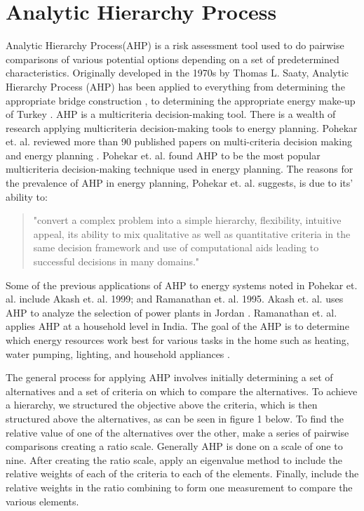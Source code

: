 \documentclass[12pt]{UIdahoMastersThesis}
\begin{document}
\section{Analytic Hierarchy Process}
Analytic Hierarchy Process(AHP) is a risk assessment tool used to do pairwise comparisons of various potential options depending on a set of predetermined characteristics. Originally developed in the 1970s by Thomas L. Saaty, Analytic Hierarchy Process (AHP) has been applied to everything from determining the appropriate bridge construction \cite{Pan2008}, to determining the appropriate energy make-up of Turkey\cite{Kahraman2010} \cite{Saaty1987}. AHP is a multicriteria decision-making tool. There is a wealth of research applying multicriteria decision-making tools to energy planning. Pohekar et. al. reviewed more than 90 published papers on multi-criteria decision making and energy planning \cite{Pohekar2004}. Pohekar et. al. found AHP to be the most popular multicriteria decision-making technique used in energy planning. The reasons for the prevalence of AHP in energy planning, Pohekar et. al. suggests, is due to its' ability to:
\begin{quote}
	"convert a complex problem into a simple hierarchy, flexibility, intuitive appeal, its ability to mix qualitative as well as quantitative criteria in the same decision framework and use of computational aids leading to successful decisions in many domains."
 \end{quote}
Some of the previous applications of AHP to energy systems noted in Pohekar et. al. include Akash et. al.  1999; and Ramanathan et. al. 1995. Akash et. al. uses AHP to analyze the selection of power plants in Jordan \cite{Akash1999}.  Ramanathan et. al. applies AHP at a household level in India.  The goal of the AHP is to determine which energy resources work best for various tasks in the home such as heating, water pumping, lighting, and household appliances \cite{Ramanathan1995}.

The general process for applying AHP involves initially determining a set of alternatives and a set of criteria on which to compare the alternatives. To achieve a hierarchy, we structured the objective above the criteria, which is then structured above the alternatives, as can be seen in figure 1 below. To find the relative value of one of the alternatives over the other, make a series of pairwise comparisons creating a ratio scale.  Generally AHP is done on a scale of one to nine. After creating the ratio scale, apply an eigenvalue method to include the relative weights of each of the criteria to each of  the elements. Finally, include the relative weights in the ratio combining to form one measurement to compare the various elements.
\end{document}

